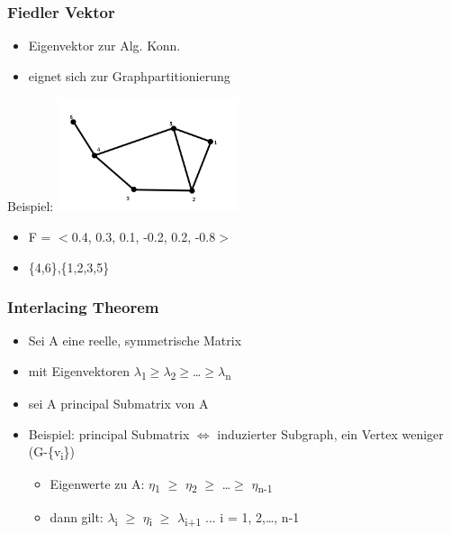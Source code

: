 \newpage

\subsubsection{Fiedler Vektor}
\begin{itemize}
	\item Eigenvektor zur Alg. Konn.
	\item eignet sich zur Graphpartitionierung
\end{itemize}

Beispiel:
\includegraphics[width=0.4\textwidth]{lectures/161028/pix/fiedler.png}
\begin{itemize}
	\item F = $<$0.4, 0.3, 0.1, -0.2, 0.2, -0.8$>$
	\item \{4,6\},\{1,2,3,5\}\newline
\end{itemize}

\subsubsection{Interlacing Theorem}
\begin{itemize}
	\item Sei A eine reelle, symmetrische Matrix
	\item mit Eigenvektoren $\lambda$\textsubscript{1}$\geq$$\lambda$\textsubscript{2}$\geq$\ldots$\geq$$\lambda$\textsubscript{n}
	\item sei A\grq{} principal Submatrix von A
	\item Beispiel: principal Submatrix $\Leftrightarrow$ induzierter Subgraph, ein Vertex weniger (G-\{v\textsubscript{i}\})
	\begin{itemize}
		\item Eigenwerte zu A\grq{}: $\eta$\textsubscript{1} $\geq$ $\eta$\textsubscript{2} $\geq$ \ldots $\geq$ $\eta$\textsubscript{n-1}
		\item dann gilt: $\lambda$\textsubscript{i} $\geq$ $\eta$\textsubscript{i} $\geq$ $\lambda$\textsubscript{i+1} ... i = 1, 2,\ldots, n-1
	\end{itemize}
\end{itemize}

